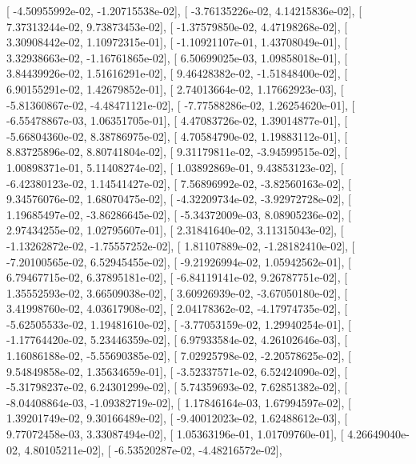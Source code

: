 \documentclass{article}
\begin{document}
       [ -4.50955992e-02,  -1.20715538e-02],
       [ -3.76135226e-02,   4.14215836e-02],
       [  7.37313244e-02,   9.73873453e-02],
       [ -1.37579850e-02,   4.47198268e-02],
       [  3.30908442e-02,   1.10972315e-01],
       [ -1.10921107e-01,   1.43708049e-01],
       [  3.32938663e-02,  -1.16761865e-02],
       [  6.50699025e-03,   1.09858018e-01],
       [  3.84439926e-02,   1.51616291e-02],
       [  9.46428382e-02,  -1.51848400e-02],
       [  6.90155291e-02,   1.42679852e-01],
       [  2.74013664e-02,   1.17662923e-03],
       [ -5.81360867e-02,  -4.48471121e-02],
       [ -7.77588286e-02,   1.26254620e-01],
       [ -6.55478867e-03,   1.06351705e-01],
       [  4.47083726e-02,   1.39014877e-01],
       [ -5.66804360e-02,   8.38786975e-02],
       [  4.70584790e-02,   1.19883112e-01],
       [  8.83725896e-02,   8.80741804e-02],
       [  9.31179811e-02,  -3.94599515e-02],
       [  1.00898371e-01,   5.11408274e-02],
       [  1.03892869e-01,   9.43853123e-02],
       [ -6.42380123e-02,   1.14541427e-02],
       [  7.56896992e-02,  -3.82560163e-02],
       [  9.34576076e-02,   1.68070475e-02],
       [ -4.32209734e-02,  -3.92972728e-02],
       [  1.19685497e-02,  -3.86286645e-02],
       [ -5.34372009e-03,   8.08905236e-02],
       [  2.97434255e-02,   1.02795607e-01],
       [  2.31841640e-02,   3.11315043e-02],
       [ -1.13262872e-02,  -1.75557252e-02],
       [  1.81107889e-02,  -1.28182410e-02],
       [ -7.20100565e-02,   6.52945455e-02],
       [ -9.21926994e-02,   1.05942562e-01],
       [  6.79467715e-02,   6.37895181e-02],
       [ -6.84119141e-02,   9.26787751e-02],
       [  1.35552593e-02,   3.66509038e-02],
       [  3.60926939e-02,  -3.67050180e-02],
       [  3.41998760e-02,   4.03617908e-02],
       [  2.04178362e-02,  -4.17974735e-02],
       [ -5.62505533e-02,   1.19481610e-02],
       [ -3.77053159e-02,   1.29940254e-01],
       [ -1.17764420e-02,   5.23446359e-02],
       [  6.97933584e-02,   4.26102646e-03],
       [  1.16086188e-02,  -5.55690385e-02],
       [  7.02925798e-02,  -2.20578625e-02],
       [  9.54849858e-02,   1.35634659e-01],
       [ -3.52337571e-02,   6.52424090e-02],
       [ -5.31798237e-02,   6.24301299e-02],
       [  5.74359693e-02,   7.62851382e-02],
       [ -8.04408864e-03,  -1.09382719e-02],
       [  1.17846164e-03,   1.67994597e-02],
       [  1.39201749e-02,   9.30166489e-02],
       [ -9.40012023e-02,   1.62488612e-03],
       [  9.77072458e-03,   3.33087494e-02],
       [  1.05363196e-01,   1.01709760e-01],
       [  4.26649040e-02,   4.80105211e-02],
       [ -6.53520287e-02,  -4.48216572e-02],
\end{document}
